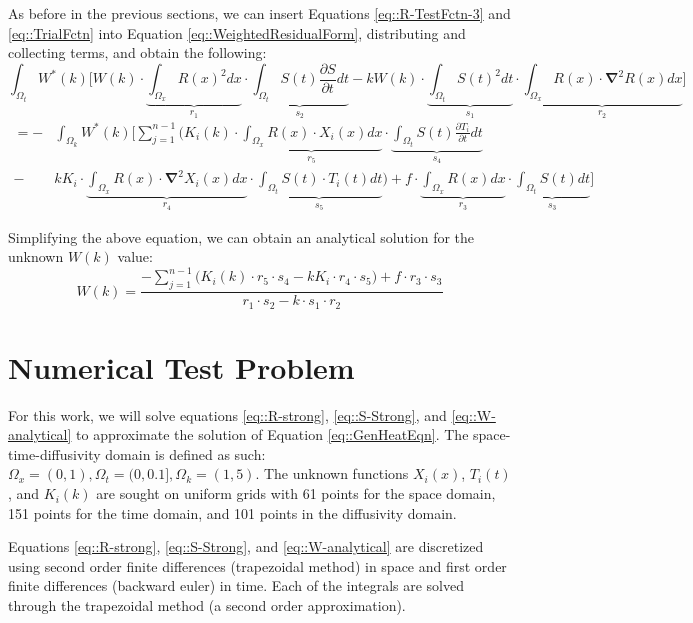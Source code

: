 \documentclass{article}
\def\ds{\displaystyle}
\def\pd{\partial}
\def\grad{\mathbf\nabla}
\begin{document}
As before in the previous sections, we can insert Equations \ref{eq::R-TestFctn-3} and \ref{eq::TrialFctn} into Equation \ref{eq::WeightedResidualForm}, distributing and collecting terms, and obtain the following:
\begin{equation*}
\ds\int_{\Omega_t} W^*(k) \bigg[W(k) \cdot \underbrace{\ds\int_{\Omega_x} R(x)^2 dx}_{r_1} \cdot \underbrace{\ds\int_{\Omega_t} S(t)\frac{\pd S}{\pd t} dt}_{s_2} - kW(k) \cdot \underbrace{\ds\int_{\Omega_t} S(t)^2 dt}_{s_1} \cdot \underbrace{\ds\int_{\Omega_x} R(x)\cdot \grad^2R(x) dx}_{r_2} \bigg]
\end{equation*}\vspace{-15pt}
\begin{align}
=  -& \ds\int_{\Omega_k} W^*(k) \Bigg[\ds\sum_{j=1}^{n-1} \bigg( K_i(k) \cdot \underbrace{\ds\int_{\Omega_x} R(x)\cdot X_i(x) dx}_{r_5} \cdot \underbrace{\ds\int_{\Omega_t} S(t) \frac{\pd T_i}{\pd t} dt}_{s_4} \nonumber\\
- &k K_i  \cdot \underbrace{\ds\int_{\Omega_x} R(x)\cdot \grad^2 X_i(x)dx}_{r_4} \cdot \underbrace{\ds\int_{\Omega_t} S(t)\cdot T_i(t)dt}_{s_5}\bigg) + f\cdot \underbrace{\ds\int_{\Omega_x} R(x) dx }_{r_3} \cdot \underbrace{\ds\int_{\Omega_t}S(t)dt}_{s_3} \Bigg]
\end{align}

Simplifying the above equation, we can obtain an analytical solution for the unknown $W(k)$ value:
\begin{equation}
\label{eq::W-analytical}
W(k) =  \frac{-\ds\sum_{j=1}^{n-1} \bigg( K_i(k) \cdot r_5 \cdot s_4 -  k K_i \cdot r_4 \cdot s_5\bigg) + f\cdot r_3 \cdot s_3}{r_1 \cdot s_2 - k \cdot s_1 \cdot r_2}
\end{equation}

\section{Numerical Test Problem}
For this work, we will solve equations \ref{eq::R-strong}, \ref{eq::S-Strong}, and \ref{eq::W-analytical} to approximate the solution of Equation \ref{eq::GenHeatEqn}. The space-time-diffusivity domain is defined as such: $\Omega_x = (0,1), \Omega_t = (0,0.1], \Omega_k = (1,5)$. The unknown functions $X_i(x)$, $T_i(t)$, and $K_i(k)$ are sought on uniform grids with 61 points for the space domain, 151 points for the time domain, and 101 points in the diffusivity domain.

Equations \ref{eq::R-strong}, \ref{eq::S-Strong}, and \ref{eq::W-analytical} are discretized using second order finite differences (trapezoidal method) in space and first order finite differences  (backward euler) in time. Each of the integrals are solved through the trapezoidal method (a second order approximation). 
\end{document}
